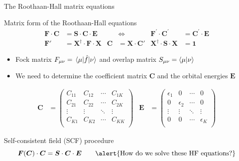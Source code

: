 \documentclass[aspectratio=169,9pt]{beamer}
\newcommand{\bC}{\boldsymbol{C}}
\newcommand{\bE}{\boldsymbol{E}}
\newcommand{\bI}{\boldsymbol{1}}
\newcommand{\bS}{\boldsymbol{S}}
\newcommand{\bF}{\boldsymbol{F}}
\newcommand{\bX}{\boldsymbol{X}}
\newcommand{\hf}{\Hat{f}}
\begin{document}
\begin{frame}{The Roothaan-Hall matrix equations}
	\small
	\begin{block}{Matrix form of the Roothaan-Hall equations}
		\begin{align*}
			\bF \cdot \bC & = \bS \cdot \bC \cdot \bE 
			&
			& \Leftrightarrow  
			&
			\bF^\prime \cdot \bC^\prime & = \bC^\prime \cdot \bE
			\\
			\bF' & = \bX^\dag \cdot \bF \cdot \bX 
			& 
			\bC & = \bX \cdot  \bC'
			& 
			\bX^\dag \cdot  \bS \cdot  \bX & = \bI
		\end{align*}
		\begin{itemize}	
			\item \alert{Fock matrix} $ F_{\mu\nu} = \mel{ \mu }{ \hf }{ \nu }$ and \alert{overlap matrix} $S_{\mu\nu} = \braket{ \mu }{ \nu }$
			\item We need to determine the \alert{coefficient matrix} $\bC$ and the \alert{orbital energies} $\bE$
		\end{itemize}
		\begin{align*}
			\bC & = 
			\begin{pmatrix}
				C_{11}	&	C_{12}	&	\cdots	&	C_{1K}	\\
				C_{21}	&	C_{22}	&	\cdots	&	C_{2K}	\\
				\vdots	&	\vdots	&	\ddots	&	\vdots	\\
				C_{K1}	&	C_{K2}	&	\cdots	&	C_{KK}	\\				
			\end{pmatrix}
			&
			\bE & = 
			\begin{pmatrix}
				\epsilon_{1}	&	0			&	\cdots	&	0		\\
				0			&	\epsilon_{2}	&	\cdots	&	0			\\
				\vdots		&	\vdots		&	\ddots	&	\vdots		\\
				0			&	0			&	\cdots	&	\epsilon_{K}	\\				
			\end{pmatrix}		
		\end{align*}
	\end{block}
	\begin{block}{Self-consistent field (SCF) procedure}
		\begin{equation*}
			\bF(\bC) \cdot \bC 
			= \bS \cdot \bC \cdot \bE
			\qquad \text{\alert{How do we solve these HF equations?}}
		\end{equation*}
	\end{block}
\end{frame}
\end{document}
